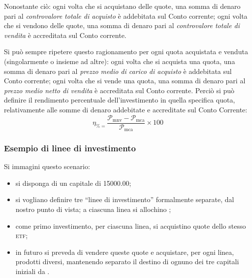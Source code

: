 \documentclass[12pt,a4paper]{article}
\newcommand{\Eur}[1]{\qty{#1}{\text{\euro{}}}}
\newcommand{\CalcoloRendimentoPercentualeSim}[2]{\frac{#1 - #2}{#2} \times{} \num{100}}
\newcommand{\Parentesi}[1]{(#1)}
\newcommand{\Virgolette}[1]{``#1''}
\newcommand{\Etf}[1]{\textsc{etf}}
\newcommand{\Pmc}[1]{\mathcal{P}_{\mathrm{mc}#1}}
\newcommand{\Pmca}[1]{\Pmc{\mathrm{a}#1}}
\newcommand{\Pmnv}[1]{\mathcal{P}_{\mathrm{mnv}#1}}
\newcommand{\Rperc}[1]{\eta_{\%#1}}
\begin{document}
Nonostante  ciò:  ogni  volta  che  si  acquistano   delle  quote,  una  somma  di  denaro  pari  al
\emph{controvalore totale di  acquisto} è addebitata sul  Conto corrente; ogni volta  che si vendono
delle quote,  una somma di denaro  pari al \emph{controvalore  totale di vendita} è  accreditata sul
Conto corrente.

Si   può   sempre   ripetere   questo   ragionamento   per   ogni   quota   acquistata   e   venduta
\Parentesi{singolarmente o  insieme ad altre}: ogni  volta che si  acquista una quota, una  somma di
denaro pari al \emph{prezzo medio di carico di acquisto} è addebitata sul Conto corrente; ogni volta
che  si vende  una  quota, una  somma di  denaro  pari al  \emph{prezzo  medio netto  di vendita}  è
accreditata sul Conto corrente.  Perciò si  può definire il rendimento percentuale dell'investimento
in quella  specifica quota, relativamente  alle somme di denaro  addebitate e accreditate  sul Conto
Corrente:
\begin{equation*}
  \Rperc = \CalcoloRendimentoPercentualeSim{\Pmnv{}}{\Pmca{}}
\end{equation*}


\subsubsection{Esempio di linee di investimento}


Si immagini questo scenario:
\begin{itemize}
\item si disponga di un capitale di \Eur{15000,00};
\item si vogliano  definire tre \Virgolette{linee di investimento} formalmente  separate, dal nostro
  punto di vista; a ciascuna linea si allochino \unoStratInvLineeCapitaleIniziale{{}};
\item come primo investimento, per ciascuna linea, si acquistino quote dello stesso \Etf{};
\item in futuro si  preveda di vendere queste quote e acquistare, per  ogni linea, prodotti diversi,
  mantenendo    separato    il    destino    di    ognuno   dei    tre    capitali    iniziali    da
  \unoStratInvLineeCapitaleIniziale{{}}.
\end{itemize}
\end{document}
